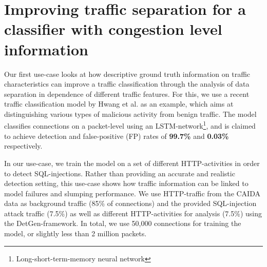 \documentclass[conference]{IEEEtran}
\begin{document}





\section{Improving traffic separation for a classifier with congestion level information}


Our first use-case looks at how descriptive ground truth information on traffic characteristics can improve a traffic classification through the analysis of data separation in dependence of different traffic features. For this, we use a recent traffic classification model by Hwang et al. \cite{hwang2019lstm} as an example, which aims at distinguishing various types of malicious activity from benign traffic.
The model classifies connections on a packet-level using an LSTM-network\footnote{Long-short-term-memory neural network}, and is claimed to achieve detection and false-positive (FP) rates of \textbf{99.7\%} and \textbf{0.03\%} respectively. 


In our use-case, we train the model on a set of different HTTP-activities in order to detect SQL-injections. Rather than providing an accurate and realistic detection setting, this use-case shows how traffic information can be linked to model failures and slumping performance. We use HTTP-traffic from the CAIDA data as background traffic (85\% of connections) and the provided SQL-injection attack traffic (7.5\%) as well as different HTTP-activities for analysis (7.5\%) using the DetGen-framework. In total, we use 50,000 connections for training the model, or slightly less than 2 million packets. 
\end{document}
